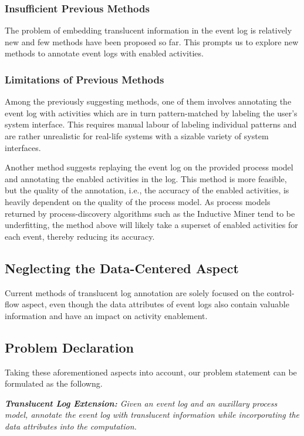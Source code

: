 \subsubsection*{Insufficient Previous Methods}
The problem of embedding translucent information in the event log is relatively new and few methods have been proposed so far. This prompts us to explore new methods to annotate event logs with enabled activities.

\subsubsection*{Limitations of Previous Methods}
Among the previously suggesting methods, one of them involves annotating the event log with activities which are in turn pattern-matched by labeling the user's system interface. This requires manual labour of labeling individual patterns and are rather unrealistic for real-life systems with a sizable variety of system interfaces.

Another method suggests replaying the event log on the provided process model and annotating the enabled activities in the log. This method is more feasible, but the quality of the annotation, i.e., the accuracy of the enabled activities, is heavily dependent on the quality of the process model. As process models returned by process-discovery algorithms such as the Inductive Miner tend to be underfitting, the method above will likely take a superset of enabled activities for each event, thereby reducing its accuracy.

\subsection*{Neglecting the Data-Centered Aspect}
Current methods of translucent log annotation are solely focused on the control-flow aspect, even though the data attributes of event logs also contain valuable information and have an impact on activity enablement.  

\subsection{Problem Declaration}

Taking these aforementioned aspects into account, our problem statement can be formulated as the followng.

\begin{center}
	\emph{\textbf{Translucent Log Extension:} Given an event log and an auxillary process model, annotate the event log with translucent information while incorporating the data attributes into the computation.}
\end{center}

